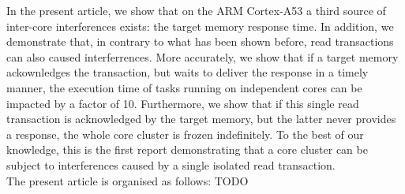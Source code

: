     In the present article, we show that on the ARM Cortex-A53 \cite{ARM-cortex-A53} a third source of inter-core interferences exists: the target memory response time. In addition, we demonstrate that, in contrary to what has been shown before, read transactions can also caused interferrences. More accurately, we show that if a target memory ackownledges the transaction, but waits to deliver the response in a timely manner, the execution time of tasks running on independent cores can be impacted by a factor of 10. Furthermore, we show that if this single read transaction is acknowledged by the target memory, but the latter never provides a response, the whole core cluster is frozen indefinitely. To the best of our knowledge, this is the first report demonstrating that a core cluster can be subject to interferences caused by a single isolated read transaction.\\

    The present article is organised as follows: TODO
